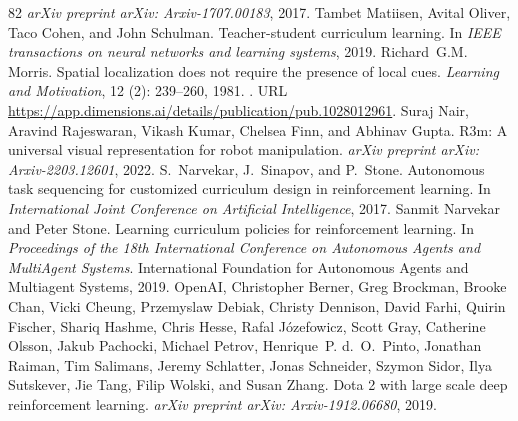 \documentclass{article}
\begin{document}
\begin{thebibliography}{82}
\newblock \emph{arXiv preprint arXiv: Arxiv-1707.00183}, 2017.
Tambet Matiisen, Avital Oliver, Taco Cohen, and John Schulman.
\newblock Teacher-student curriculum learning.
\newblock In \emph{IEEE transactions on neural networks and learning systems}, 2019.
Richard~G.M. Morris.
\newblock Spatial localization does not require the presence of local cues.
\newblock \emph{Learning and Motivation}, 12 (2): 239--260, 1981.
\newblock {}.
\newblock URL \url{https://app.dimensions.ai/details/publication/pub.1028012961}.
Suraj Nair, Aravind Rajeswaran, Vikash Kumar, Chelsea Finn, and Abhinav Gupta.
\newblock R3m: A universal visual representation for robot manipulation.
\newblock \emph{arXiv preprint arXiv: Arxiv-2203.12601}, 2022.
S.~Narvekar, J.~Sinapov, and P.~Stone.
\newblock Autonomous task sequencing for customized curriculum design in reinforcement learning.
\newblock In \emph{International Joint Conference on Artificial Intelligence}, 2017.
Sanmit Narvekar and Peter Stone.
\newblock Learning curriculum policies for reinforcement learning.
\newblock In \emph{Proceedings of the 18th International Conference on Autonomous Agents and MultiAgent Systems}. International Foundation for Autonomous Agents and Multiagent Systems, 2019.
OpenAI, Christopher Berner, Greg Brockman, Brooke Chan, Vicki Cheung, Przemyslaw Debiak, Christy Dennison, David Farhi, Quirin Fischer, Shariq Hashme, Chris Hesse, Rafal Józefowicz, Scott Gray, Catherine Olsson, Jakub Pachocki, Michael Petrov, Henrique~P. d.~O.~Pinto, Jonathan Raiman, Tim Salimans, Jeremy Schlatter, Jonas Schneider, Szymon Sidor, Ilya Sutskever, Jie Tang, Filip Wolski, and Susan Zhang.
\newblock Dota 2 with large scale deep reinforcement learning.
\newblock \emph{arXiv preprint arXiv: Arxiv-1912.06680}, 2019.

\end{thebibliography}
\end{document}
